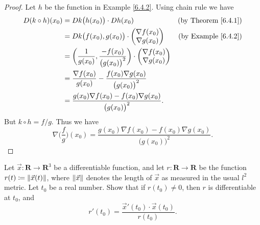 \begin{proof}
    Let \(h\) be the function in Example \ref{6.4.2}.
    Using chain rule we have
    \begin{align*}
        D (k \circ h)(x_0) & = D k\big(h(x_0)\big) \cdot D h(x_0)                                                     & \text{(by Theorem \ref{6.4.1})} \\
                           & = D k\big(f(x_0), g(x_0)\big) \cdot \begin{pmatrix}
                                                                     \nabla f(x_0) \\
                                                                     \nabla g(x_0)
                                                                 \end{pmatrix}                                      & \text{(by Example \ref{6.4.2})}   \\
                           & = \bigg(\frac{1}{g(x_0)}, \frac{-f(x_0)}{\big(g(x_0)\big)^2}\bigg) \cdot \begin{pmatrix}
                                                                                                          \nabla f(x_0) \\
                                                                                                          \nabla g(x_0)
                                                                                                      \end{pmatrix}                                    \\
                           & = \frac{\nabla f(x_0)}{g(x_0)} - \frac{f(x_0) \nabla g(x_0)}{\big(g(x_0)\big)^2}                                           \\
                           & = \frac{g(x_0) \nabla f(x_0) - f(x_0) \nabla g(x_0)}{\big(g(x_0)\big)^2}.
    \end{align*}
    But \(k \circ h = f / g\).
    Thus we have
    \[
        \nabla \bigg(\frac{f}{g}\bigg)(x_0) = \frac{g(x_0) \nabla f(x_0) - f(x_0) \nabla g(x_0)}{\big(g(x_0)\big)^2}.
    \]
\end{proof}

\begin{exercise}\label{ex 6.4.5}
    Let \(\vec{x} : \mathbf{R} \to \mathbf{R}^3\) be a differentiable function, and let \(r : \mathbf{R} \to \mathbf{R}\) be the function \(r(t) \coloneqq \norm*{\vec{x}(t)}\), where \(\norm*{\vec{x}}\) denotes the length of \(\vec{x}\) as measured in the usual \(l^2\) metric.
    Let \(t_0\) be a real number.
    Show that if \(r(t_0) \neq 0\), then \(r\) is differentiable at \(t_0\), and
    \[
        r'(t_0) = \frac{\vec{x}'(t_0) \cdot \vec{x}(t_0)}{r(t_0)}.
    \]
\end{exercise}


